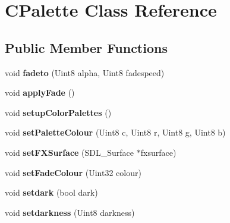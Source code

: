 \hypertarget{class_c_palette}{
\section{CPalette Class Reference}
\label{class_c_palette}
}
\subsection*{Public Member Functions}
\begin{DoxyCompactItemize}
\item 
\hypertarget{class_c_palette_a4777b4fc68d29ffaf1ddf8f9aeeabc4e}{
void {\bfseries fadeto} (Uint8 alpha, Uint8 fadespeed)}
\label{class_c_palette_a4777b4fc68d29ffaf1ddf8f9aeeabc4e}

\item 
\hypertarget{class_c_palette_a986860f447d35cdd2bfb087e99c40e1b}{
void {\bfseries applyFade} ()}
\label{class_c_palette_a986860f447d35cdd2bfb087e99c40e1b}

\item 
\hypertarget{class_c_palette_af641f129799f59867796649775d0731b}{
void {\bfseries setupColorPalettes} ()}
\label{class_c_palette_af641f129799f59867796649775d0731b}

\item 
\hypertarget{class_c_palette_aa48934dcfc7e3609109c596fa487387b}{
void {\bfseries setPaletteColour} (Uint8 c, Uint8 r, Uint8 g, Uint8 b)}
\label{class_c_palette_aa48934dcfc7e3609109c596fa487387b}

\item 
\hypertarget{class_c_palette_aebf8fe9e0d1b6097cedf7f9604cbf7b7}{
void {\bfseries setFXSurface} (SDL\_\-Surface $\ast$fxsurface)}
\label{class_c_palette_aebf8fe9e0d1b6097cedf7f9604cbf7b7}

\item 
\hypertarget{class_c_palette_a3019dfec6002bdc9fc999cd71161a0b1}{
void {\bfseries setFadeColour} (Uint32 colour)}
\label{class_c_palette_a3019dfec6002bdc9fc999cd71161a0b1}

\item 
\hypertarget{class_c_palette_a9dfc0d124c1950b79d4bcdf0590360e4}{
void {\bfseries setdark} (bool dark)}
\label{class_c_palette_a9dfc0d124c1950b79d4bcdf0590360e4}

\item 
\hypertarget{class_c_palette_abcc68358a6fa829029e789ad75ee5234}{
void {\bfseries setdarkness} (Uint8 darkness)}
\label{class_c_palette_abcc68358a6fa829029e789ad75ee5234}


\end{DoxyCompactItemize}
